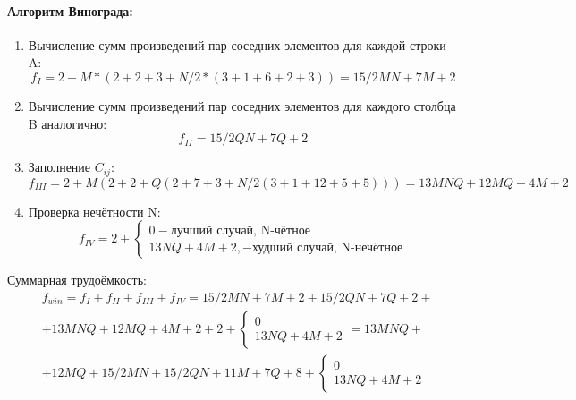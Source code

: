\paragraph{Алгоритм Винограда:}
\begin{enumerate}
	\item Вычисление сумм произведений пар соседних элементов для каждой строки A:
		\begin{equation}
		f_{I}=2+M*(2+2+3+N/2*(3+1+6+2+3))=15/2MN+7M+2
		\end{equation}
	\item Вычисление сумм произведений пар соседних элементов для каждого столбца B аналогично:
		\begin{equation}
		f_{II}=15/2QN+7Q+2
		\end{equation}
	\item Заполнение $C_{ij}$:
		\begin{equation}
		f_{III}=2+M(2+2+Q(2+7+3+N/2(3+1+12+5+5)))=13MNQ+12MQ+4M+2
		\end{equation}
	\item Проверка нечётности N:
		\begin{equation}
		f_{IV}=2+\begin{cases}
		0-\text{лучший случай, N-чётное}\\
		13NQ+4M+2,-\text{худший случай, N-нечётное}
		\end{cases}
		\end{equation}
\end{enumerate}
Суммарная трудоёмкость:
\begin{equation}
	\begin{split}
		&f_{win}=f_{I}+f_{II}+f_{III}+f_{IV}=15/2MN+7M+2+15/2QN+7Q+2+\\
		&+13MNQ+12MQ+4M+2+2+\begin{cases}0\\13NQ+4M+2\end{cases}=13MNQ+\\
		&+12MQ+15/2MN+15/2QN+11M+7Q+8+\begin{cases}0\\13NQ+4M+2\end{cases}
	\end{split}
\end{equation}

